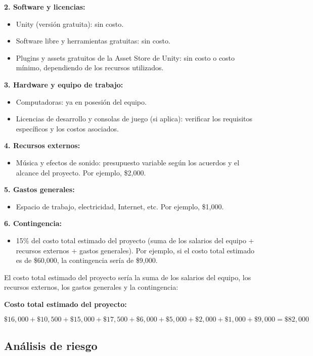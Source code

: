 \textbf{2. Software y licencias:}
\begin{itemize}
	\item Unity (versión gratuita): sin costo.
	\item Software libre y herramientas gratuitas: sin costo.
	\item Plugins y assets gratuitos de la Asset Store de Unity: sin costo o costo mínimo, dependiendo de los recursos utilizados.
\end{itemize}

\textbf{3. Hardware y equipo de trabajo:}
\begin{itemize}
	\item Computadoras: ya en posesión del equipo.
	\item Licencias de desarrollo y consolas de juego (si aplica): verificar los requisitos específicos y los costos asociados.
\end{itemize}

\textbf{4. Recursos externos:}
\begin{itemize}
	\item Música y efectos de sonido: presupuesto variable según los acuerdos y el alcance del proyecto. Por ejemplo, \$2,000.
\end{itemize}

\textbf{5. Gastos generales:}
\begin{itemize}
	\item Espacio de trabajo, electricidad, Internet, etc. Por ejemplo, \$1,000.
\end{itemize}

\textbf{6. Contingencia:}
\begin{itemize}
	\item 15\% del costo total estimado del proyecto (suma de los salarios del equipo + recursos externos + gastos generales). Por ejemplo, si el costo total estimado es de \$60,000, la contingencia sería de \$9,000.
\end{itemize}

El costo total estimado del proyecto sería la suma de los salarios del equipo, los recursos externos, los gastos generales y la contingencia:

\textbf{Costo total estimado del proyecto:}

\[\$16,000+\$10,500+\$15,000+\$17,500+\$6,000+\$5,000+\$2,000+\$1,000+\$9,000=\$82,000\]

\subsection{Análisis de riesgo}

